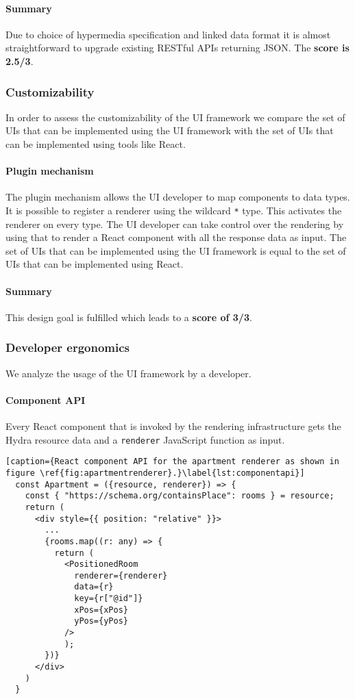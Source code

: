 \paragraph{Summary}
Due to choice of hypermedia specification and linked data format it is almost straightforward to upgrade existing RESTful APIs returning JSON. The \textbf{score is 2.5/3}.

\subsubsection{Customizability}
In order to assess the customizability of the UI framework we compare the set of UIs that can be implemented using the UI framework with the set of UIs that can be implemented using tools like React.

\paragraph{Plugin mechanism}
The plugin mechanism allows the UI developer to map components to data types. It is possible to register a renderer using the wildcard \lstinline{*} type. This activates the renderer on every type. The UI developer can take control over the rendering by using that to render a React component with all the response data as input. The set of UIs that can be implemented using the UI framework is equal to the set of UIs that can be implemented using React.

\paragraph{Summary}
This design goal is fulfilled which leads to a \textbf{score of 3/3}.

\subsubsection{Developer ergonomics}
We analyze the usage of the UI framework by a developer.

\paragraph{Component API}
Every React component that is invoked by the rendering infrastructure gets the Hydra resource data and a \lstinline{renderer} JavaScript function as input.

\lstset{language=JSON}
\begin{lstlisting}[caption={React component API for the apartment renderer as shown in figure \ref{fig:apartmentrenderer}.}\label{lst:componentapi}]
  const Apartment = ({resource, renderer}) => {
    const { "https://schema.org/containsPlace": rooms } = resource;
    return (
      <div style={{ position: "relative" }}>
        ...
        {rooms.map((r: any) => {
          return (
            <PositionedRoom
              renderer={renderer}
              data={r}
              key={r["@id"]}
              xPos={xPos}
              yPos={yPos}
            />
            );
        })}
      </div>
    )
  }
\end{lstlisting}


